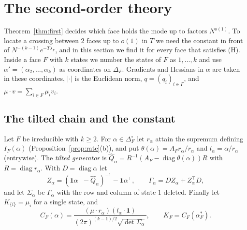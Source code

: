 \section{The second-order theory}\label{sec:secondorder}

Theorem~\ref{thm:first} decides which face holds the mode up to factors
$N^{o(1)}$. To locate a crossing between 2 faces up to $o(1)$ in $T$ we need
the constant in front of $N^{-(k-1)}e^{-T\lambda_F}$, and in this section we
find it for every face that satisfies (H). Inside a face $F$ with $k$ states
we number the states of $F$ as $1,\dots,k$ and use
$\alpha'=(\alpha_2,\dots,\alpha_k)$ as coordinates on $\Delta_F$. Gradients
and Hessians in $\alpha$ are taken in these coordinates, $|\cdot|$ is the
Euclidean norm, $q=(q_i)_{i\in F}$, and $\mu\cdot v=\sum_{i\in F}\mu_iv_i$.

\subsection{The tilted chain and the constant}

\begin{definition}\label{def:tilt}
Let $F$ be irreducible with $k\ge2$. For
$\alpha\in\Delta_F^\circ$ let $r_\alpha$ attain the supremum defining
$I_F(\alpha)$ (Proposition~\ref{prop:rate}(b)), and put
$\theta(\alpha)=A_Fr_\alpha/r_\alpha$ and $l_\alpha=\alpha/r_\alpha$
(entrywise). The \emph{tilted generator} is
$\widehat Q_\alpha=R^{-1}(A_F-\operatorname{diag}\theta(\alpha))R$ with
$R=\operatorname{diag}r_\alpha$. With $D=\operatorname{diag}\alpha$ let
\[
Z_\alpha=(\mathbf 1\alpha^\top-\widehat Q_\alpha)^{-1}-\mathbf 1\alpha^\top,
\qquad\Gamma_\alpha=DZ_\alpha+Z_\alpha^\top D,
\]
and let $\Sigma_\alpha$ be $\Gamma_\alpha$ with the row and column of state
$1$ deleted. Finally let $K_{\{i\}}=\mu_i$ for a single state, and
\[
C_F(\alpha)=\frac{(\mu\cdot r_\alpha)(l_\alpha\cdot\mathbf 1)}
{(2\pi)^{(k-1)/2}\sqrt{\det\Sigma_\alpha}},\qquad K_F=C_F(\alpha^*_F).
\]
\end{definition}

